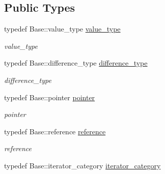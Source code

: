 \subsection*{Public Types}
\begin{DoxyCompactItemize}
\item 
\hypertarget{class_d_o_1_1_locator_a758d02a5183e542558cd2f7ad65c683c}{typedef Base\-::value\-\_\-type \hyperlink{class_d_o_1_1_locator_a758d02a5183e542558cd2f7ad65c683c}{value\-\_\-type}}\label{class_d_o_1_1_locator_a758d02a5183e542558cd2f7ad65c683c}

\begin{DoxyCompactList}\small\item\em value\-\_\-type \end{DoxyCompactList}\item 
\hypertarget{class_d_o_1_1_locator_aa4336e7fd692b20bda7b7227fa9c9f55}{typedef Base\-::difference\-\_\-type \hyperlink{class_d_o_1_1_locator_aa4336e7fd692b20bda7b7227fa9c9f55}{difference\-\_\-type}}\label{class_d_o_1_1_locator_aa4336e7fd692b20bda7b7227fa9c9f55}

\begin{DoxyCompactList}\small\item\em difference\-\_\-type \end{DoxyCompactList}\item 
\hypertarget{class_d_o_1_1_locator_aa2158dc2d25210ef557a40d3b8a521e3}{typedef Base\-::pointer \hyperlink{class_d_o_1_1_locator_aa2158dc2d25210ef557a40d3b8a521e3}{pointer}}\label{class_d_o_1_1_locator_aa2158dc2d25210ef557a40d3b8a521e3}

\begin{DoxyCompactList}\small\item\em pointer \end{DoxyCompactList}\item 
\hypertarget{class_d_o_1_1_locator_abaed3f9c23f38a6baedf841296fa931c}{typedef Base\-::reference \hyperlink{class_d_o_1_1_locator_abaed3f9c23f38a6baedf841296fa931c}{reference}}\label{class_d_o_1_1_locator_abaed3f9c23f38a6baedf841296fa931c}

\begin{DoxyCompactList}\small\item\em reference \end{DoxyCompactList}\item 
\hypertarget{class_d_o_1_1_locator_a61a96ce54a0b0407ce9bdd9d3f0e3934}{typedef Base\-::iterator\-\_\-category \hyperlink{class_d_o_1_1_locator_a61a96ce54a0b0407ce9bdd9d3f0e3934}{iterator\-\_\-category}}\label{class_d_o_1_1_locator_a61a96ce54a0b0407ce9bdd9d3f0e3934}


\end{DoxyCompactItemize}
